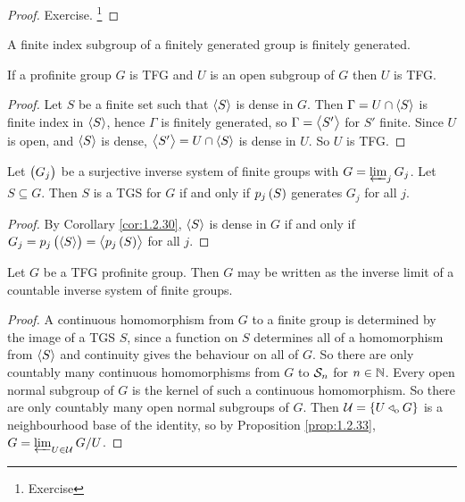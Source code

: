\begin{proof}
Exercise. \footnote{Exercise}
\end{proof}

\begin{lemma}
A finite index subgroup of a finitely generated group is finitely generated.
\end{lemma}

\begin{proposition}
If a profinite group $ G $ is TFG and $ U $ is an open subgroup of $ G $ then $ U $ is TFG.
\end{proposition}

\begin{proof}
Let $ S $ be a finite set such that $ \left\langle S \right\rangle $ is dense in $ G $. Then $ \Gamma = U \cap \left\langle S \right\rangle $ is finite index in $ \left\langle S \right\rangle $, hence $ \Gamma $ is finitely generated, so $ \Gamma = \left\langle S' \right\rangle $ for $ S' $ finite. Since $ U $ is open, and $ \left\langle S \right\rangle $ is dense, $ \left\langle S' \right\rangle = U \cap \left\langle S \right\rangle $ is dense in $ U $. So $ U $ is TFG.
\end{proof}

\begin{proposition}
Let $ \br{G_j} $ be a surjective inverse system of finite groups with $ G = \varprojlim_j G_j $. Let $ S \subseteq G $. Then $ S $ is a TGS for $ G $ if and only if $ p_j\br{S} $ generates $ G_j $ for all $ j $.
\end{proposition}

\begin{proof}
By Corollary \ref{cor:1.2.30}, $ \left\langle S \right\rangle $ is dense in $ G $ if and only if $ G_j = p_j\br{\abr{S}} = \abr{p_j\br{S}} $ for all $ j $.
\end{proof}

\begin{lemma}
Let $ G $ be a TFG profinite group. Then $ G $ may be written as the inverse limit of a countable inverse system of finite groups.
\end{lemma}

\begin{proof}
A continuous homomorphism from $ G $ to a finite group is determined by the image of a TGS $ S $, since a function on $ S $ determines all of a homomorphism from $ \left\langle S \right\rangle $ and continuity gives the behaviour on all of $ G $. So there are only countably many continuous homomorphisms from $ G $ to $ \mathcal{S}_n $ for $ n \in \mathbb{N} $. Every open normal subgroup of $ G $ is the kernel of such a continuous homomorphism. So there are only countably many open normal subgroups of $ G $. Then $ \UUU = \cbr{U \triangleleft_\o G} $ is a neighbourhood base of the identity, so by Proposition \ref{prop:1.2.33}, $ G = \varprojlim_{U \in \mathcal{U}} G / U $.
\end{proof}


